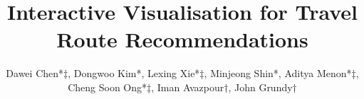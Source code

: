 \documentclass[sigconf]{acmart}
\begin{document}
\title{Interactive Visualisation for Travel Route Recommendations}

\author{Dawei Chen*$\ddagger$, Dongwoo Kim*, Lexing Xie*$\ddagger$,  Minjeong Shin*, Aditya Menon*$\ddagger$, Cheng Soon Ong*$\ddagger$, Iman Avazpour$\dagger$, John Grundy$\dagger$}


%

\renewcommand{\shortauthors}{D. Chen et al.}
\end{document}
